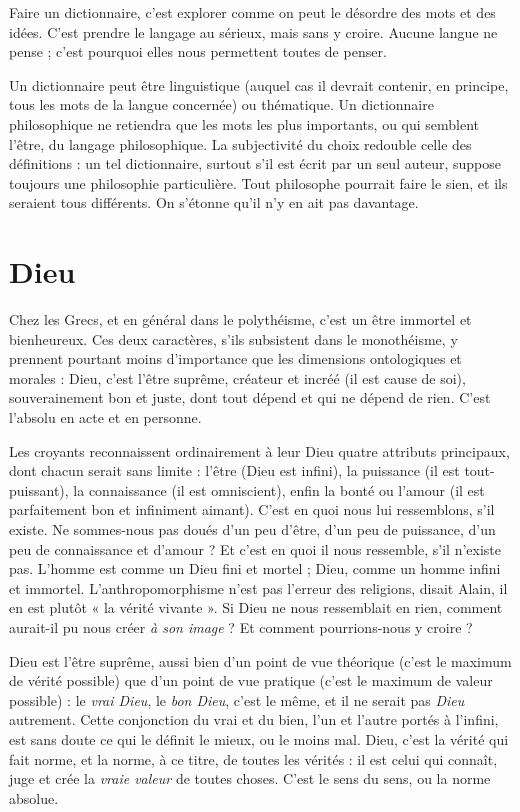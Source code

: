 Faire un dictionnaire, c’est explorer comme on peut le désordre des mots et
des idées. C’est prendre le langage au sérieux, mais sans y croire. Aucune langue
ne pense ; c’est pourquoi elles nous permettent toutes de penser.

Un dictionnaire peut être linguistique (auquel cas il devrait contenir, en
principe, tous les mots de la langue concernée) ou thématique. Un dictionnaire
philosophique ne retiendra que les mots les plus importants, ou qui semblent
l'être, du langage philosophique. La subjectivité du choix redouble celle des
définitions : un tel dictionnaire, surtout s’il est écrit par un seul auteur, suppose
toujours une philosophie particulière. Tout philosophe pourrait faire le sien, et
ils seraient tous différents. On s'étonne qu’il n’y en ait pas davantage.

\section{Dieu}
Chez les Grecs, et en général dans le polythéisme, c’est un être immortel
et bienheureux. Ces deux caractères, s'ils subsistent dans le
monothéisme, y prennent pourtant moins d'importance que les dimensions
ontologiques et morales : Dieu, c’est l’être suprême, créateur et incréé (il est
cause de soi), souverainement bon et juste, dont tout dépend et qui ne dépend
de rien. C’est l’absolu en acte et en personne.

Les croyants reconnaissent ordinairement à leur Dieu quatre attributs principaux,
dont chacun serait sans limite : l’être (Dieu est infini), la puissance (il
est tout-puissant), la connaissance (il est omniscient), enfin la bonté ou l’amour
(il est parfaitement bon et infiniment aimant). C’est en quoi nous lui ressemblons,
s’il existe. Ne sommes-nous pas doués d’un peu d’être, d’un peu de puissance,
d’un peu de connaissance et d’amour ? Et c’est en quoi il nous ressemble,
s’il n'existe pas. L'homme est comme un Dieu fini et mortel ; Dieu, comme un
homme infini et immortel. L’anthropomorphisme n’est pas l'erreur des religions,
disait Alain, il en est plutôt « la vérité vivante ». Si Dieu ne nous ressemblait
en rien, comment aurait-il pu nous créer {\it à son image} ? Et comment pourrions-nous
y croire ?

Dieu est l’être suprême, aussi bien d’un point de vue théorique (c’est le
maximum de vérité possible) que d’un point de vue pratique (c’est le maximum
de valeur possible) : le {\it vrai Dieu}, le {\it bon Dieu}, c’est le même, et il ne serait pas
{\it Dieu} autrement. Cette conjonction du vrai et du bien, l’un et l’autre portés à
l'infini, est sans doute ce qui le définit le mieux, ou le moins mal. Dieu, c’est la
vérité qui fait norme, et la norme, à ce titre, de toutes les vérités : il est celui qui
connaît, juge et crée la {\it vraie valeur} de toutes choses. C’est le sens du sens, ou la
norme absolue.


